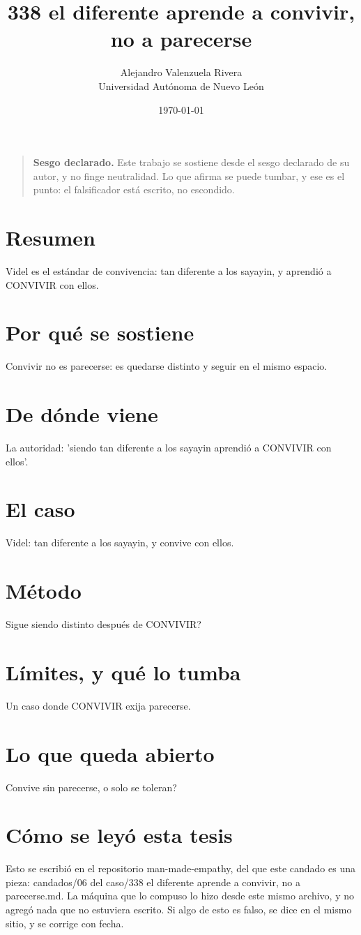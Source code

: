 \documentclass[11pt,a4paper]{article}
\title{338 el diferente aprende a convivir, no a parecerse}
\author{Alejandro Valenzuela Rivera\\\small Universidad Autónoma de Nuevo León}
\date{\today}
\begin{document}
\maketitle

\begin{quote}
\textbf{Sesgo declarado.} Este trabajo se sostiene desde el sesgo declarado de su autor, y no finge neutralidad. Lo que afirma se puede tumbar, y ese es el punto: el falsificador está escrito, no escondido.
\end{quote}

\section*{Resumen}
Videl es el estándar de convivencia: tan diferente a los sayayin, y aprendió a CONVIVIR con ellos.

\section{Por qué se sostiene}
Convivir no es parecerse: es quedarse distinto y seguir en el mismo espacio.

\section{De dónde viene}
La autoridad: 'siendo tan diferente a los sayayin aprendió a CONVIVIR con ellos'.

\section{El caso}
Videl: tan diferente a los sayayin, y convive con ellos.

\section{Método}
\textquestiondown{}Sigue siendo distinto después de CONVIVIR?

\section{Límites, y qué lo tumba}
Un caso donde CONVIVIR exija parecerse.

\section{Lo que queda abierto}
\textquestiondown{}Convive sin parecerse, o solo se toleran?

\section*{Cómo se leyó esta tesis}
Esto se escribió en el repositorio man-made-empathy, del que este candado es una pieza: candados/06 del caso/338 el diferente aprende a convivir, no a parecerse.md. La máquina que lo compuso lo hizo desde este mismo archivo, y no agregó nada que no estuviera escrito. Si algo de esto es falso, se dice en el mismo sitio, y se corrige con fecha.
\end{document}

